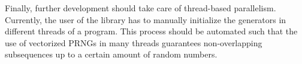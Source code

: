 \documentclass[crop=false]{stdlocal}
\begin{document}
  Finally, further development should take care of thread-based parallelism.
  Currently, the user of the library has to manually initialize the generators in different threads of a program.
  This process should be automated such that the use of vectorized PRNGs in many threads guarantees non-overlapping subsequences up to a certain amount of random numbers.
\end{document}

